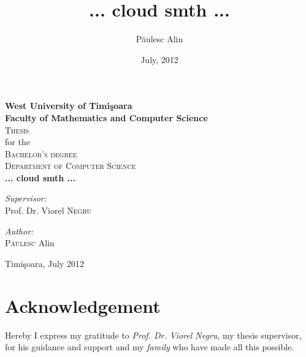 \documentclass[a4paper,12pt,titlepage]{scrreprt}
\begin{document}
\begin{titlepage}
\title{... cloud smth ...}
\author{P\u{a}ulesc Alin}
\date{July, 2012}

\begin{center}

    \textbf {\large West University of Timi\c{s}oara \\
	Faculty of Mathematics and Computer Science}\\[1.5cm]
    \textsc {\Large {Thesis}} \\[0.2cm]
    for the \\[0.2cm]
    \textsc {\Large {Bachelor's degree}}\\[0.2cm]
    \textsc {Department of Computer Science}\\[3cm]
    \textbf{\huge {... cloud smth ...}}\\[3cm]

    \begin{minipage}{0.4\textwidth}
        \begin{flushleft} \large
            \emph{Supervisor:}\\
	    Prof. Dr. Viorel \textsc{Negru}
        \end{flushleft}
    \end{minipage}
    \begin{minipage}{0.4\textwidth}
        \begin{flushright} \large
        \emph{Author:}\\
        \textsc{P\u{a}ulesc} Alin
        \end{flushright}
    \end{minipage}
    \null
    \vfill
    Timi\c{s}oara, July 2012
    \end{center}

\end{titlepage}


\setcounter{secnumdepth}{-1}

\chapter{Acknowledgement}
\begin{center}
Hereby I express my gratitude to \emph{Prof. Dr. Viorel Negru}, my thesis supervisor,\\[0.2cm]
for his guidance and support and my \emph{family} who have made all this possible.
\end{center}
\end{document}
